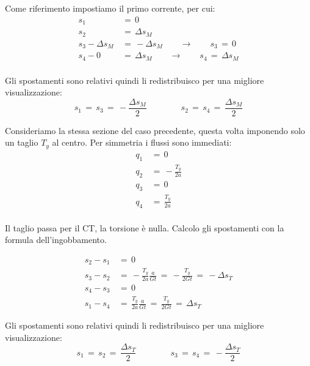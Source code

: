 \begin{esempioBox}
Come riferimento impostiamo il primo corrente, per cui:
\begin{align*}
    s_1\,&=\,0\\
     s_2\,&=\,\Delta s_M\\
     s_3-\Delta s_M \,&=\,-\Delta s_M \qquad\rightarrow\qquad s_3\,=\,0\\
      s_4-0\,&=\,\Delta s_M \qquad\rightarrow\qquad s_4\,=\,\Delta s_M\\
\end{align*}

Gli spostamenti sono relativi quindi li redistribuisco per una migliore visualizzazione:
\begin{equation*}
    s_1\,=\,s_3\,=\,-\frac{\Delta s_M}{2}\qquad\qquad   s_2\,=\,s_4\,=\,\frac{\Delta s_M}{2}
\end{equation*}
    
\end{esempioBox}



\begin{esempioBox}
    Consideriamo la stessa sezione del caso precedente, questa volta imponendo solo un taglio $T_y$ al centro. Per simmetria i flussi sono immediati:
    \begin{align*}
     q_1 \,&=\, 0\\
      q_2 \,&=\,-\frac{T_y}{2a} \\
      q_3 \,&=\,0 \\
      q_4 \,&=\,\frac{T_y}{2a} \\
\end{align*}

Il taglio passa per il CT, la torsione è nulla. Calcolo gli spostamenti con la formula dell'ingobbamento.

\begin{align*}
     s_{2}-s_{1} \,&=\,0\\
      s_{3}-s_{2} \,&=\,-\frac{T_y}{2a} \frac{a}{Gt}\,=\,  -\frac{T_y}{2Gt}\,=\, -\Delta s_T\\
      s_{4}-s_{3} \,&=\,0\\
      s_{1}-s_{4} \,&=\,\frac{T_y}{2a} \frac{a}{Gt}\,=\,  \frac{T_y}{2Gt}\,=\, \Delta s_T
\end{align*}

Gli spostamenti sono relativi quindi li redistribuisco per una migliore visualizzazione:
\begin{equation*}
    s_1\,=\,s_2\,=\,\frac{\Delta s_T}{2}\qquad\qquad   s_3\,=\,s_4\,=\,-\frac{\Delta s_T}{2}
\end{equation*}
    
\end{esempioBox}


